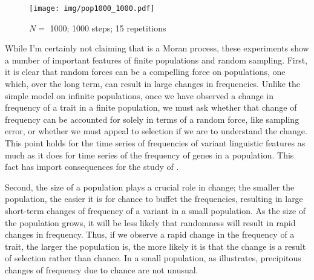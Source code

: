 \documentclass[output=paper]{langsci/langscibook}
\begin{document}
\begin{figure}
    \texttt{[image: img/pop1000\_1000.pdf]}
    \caption{$N=$ \num{1000}; \num{1000} steps; 15 repetitions\label{random_fig3}}
\end{figure}

While I'm certainly not claiming that  is a Moran
process, these experiments show a number of important features of
finite populations and random sampling.  First, it is clear that
random forces can be a compelling force on populations, one which,
over the long term, can result in large changes in frequencies.
Unlike the simple model on infinite populations, once we have observed
a change in frequency of a trait in a finite population, we must ask
whether that change of frequency can be accounted for solely in terms
of a random force, like sampling error, or whether we must appeal to
selection if we are to understand the change. This point holds for the
time series of frequencies of variant linguistic features as much as
it does for time series of the frequency of genes in a population.
This fact has import consequences for the study of .

Second, the size of a population plays a crucial role in change; the smaller
the population, the easier it is for chance to buffet the frequencies,
resulting in large short-term changes of frequency of a variant in a small
population.  As the size of the population grows, it will be less likely that
randomness will result in rapid changes in frequency. Thus, if we observe a
rapid change in the frequency of a trait, the larger the population is, the
more likely it is that the change is a result of selection rather than chance.
In a small population, as  illustrates, precipitous changes
of frequency due to chance are not unusual.
\end{document}
